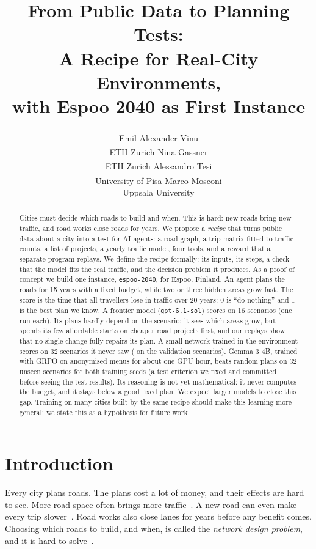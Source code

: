 \documentclass{article}
\title{From Public Data to Planning Tests:\\A Recipe for Real-City Environments,\\with Espoo 2040 as First Instance}
\author{
  Emil Alexander Vinu\textsuperscript{\dag} \\ ETH Zurich \And
  Nina Gassner\textsuperscript{\dag} \\ ETH Zurich \And
  Alessandro Tesi\textsuperscript{\dag} \\ University of Pisa \And
  Marco Mosconi\textsuperscript{\dag} \\ Uppsala University
}
\newcommand{\repo}{\texttt{espoo-2040}}
\begin{document}
\maketitle
{\renewcommand{\thefootnote}{\fnsymbol{footnote}}}

\begin{abstract}
Cities must decide which roads to build and when. This is hard: new roads bring new traffic, and road works close roads for years. We propose a \emph{recipe} that turns public data about a city into a test for AI agents: a road graph, a trip matrix fitted to traffic counts, a list of projects, a yearly traffic model, four tools, and a reward that a separate program replays. We define the recipe formally: its inputs, its steps, a check that the model fits the real traffic, and the decision problem it produces. As a proof of concept we build one instance, \repo{}, for Espoo, Finland. An agent plans the roads for 15 years with a fixed budget, while two or three hidden areas grow fast. The score is the time that all travellers lose in traffic over 20 years: 0 is ``do nothing'' and 1 is the best plan we know. A frontier model (\texttt{gpt-6.1-sol}) scores \agentMeanAll{} on 16 scenarios (one run each). Its plans hardly depend on the scenario: it sees which areas grow, but spends its few affordable starts on cheaper road projects first, and our replays show that no single change fully repairs its plan. A small network trained in the environment scores \testRlScore{} on 32 scenarios it never saw (\rlScore{} on the validation scenarios). Gemma 3 4B, trained with GRPO on anonymised menus for about one GPU hour, beats random plans on 32 unseen scenarios for both training seeds (a test criterion we fixed and committed before seeing the test results). Its reasoning is not yet mathematical: it never computes the budget, and it stays below a good fixed plan. We expect larger models to close this gap. Training on many cities built by the same recipe should make this learning more general; we state this as a hypothesis for future work.
\end{abstract}

\section{Introduction}

Every city plans roads. The plans cost a lot of money, and their effects are hard to see. More road space often brings more traffic~\cite{duranton2011,goodwin1996}. A new road can even make every trip slower~\cite{braess1968}. Road works also close lanes for years before any benefit comes. Choosing which roads to build, and when, is called the \emph{network design problem}, and it is hard to solve~\cite{johnson1978,farahani2013}.
\end{document}
